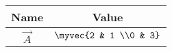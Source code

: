 \begin{tabular}{|c|c|}
\hline
\textbf{Name} & \textbf{Value} \\ \hline
$\vec{A}$ & $\myvec{2 & 1 \\0 & 3}$ \\ \hline
\end{tabular}
